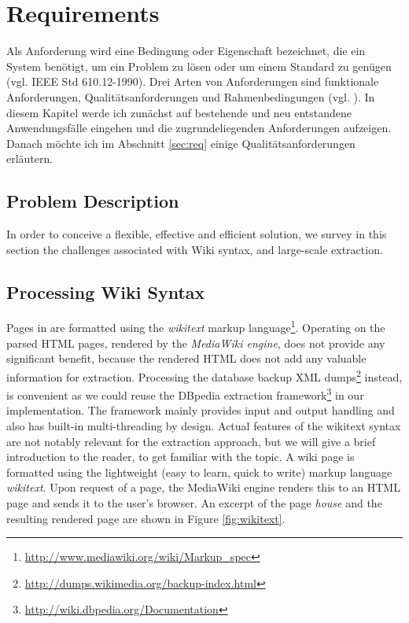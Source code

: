 \section{Requirements}
\label{sec:requirements}
Als Anforderung wird eine Bedingung oder Eigenschaft bezeichnet, die ein System benötigt, um ein Problem zu lösen oder um einem Standard zu genügen (vgl. IEEE Std 610.12-1990). Drei Arten von Anforderungen sind funktionale Anforderungen, Qualitätsanforderungen und Rahmenbedingungen (vgl. \cite{young}). In diesem Kapitel werde ich zunächst auf bestehende und neu entstandene Anwendungsfälle eingehen und die zugrundeliegenden Anforderungen aufzeigen. Danach möchte ich im Abschnitt \ref{sec:req} einige Qualitätsanforderungen erläutern.

\subsection{Problem Description}
\label{sec:problem}

In order to conceive a flexible, effective and efficient solution, we survey in this section the challenges associated with Wiki syntax, \wik and large-scale extraction.

\subsection{Processing Wiki Syntax}
Pages in \wik are formatted using the \textit{wikitext} markup language\footnote{\url{http://www.mediawiki.org/wiki/Markup_spec}}.
Operating on the parsed HTML pages, rendered by the \emph{MediaWiki engine}, does not provide any significant benefit, because the rendered HTML does not add any valuable information for extraction. 
Processing the database backup XML dumps\footnote{\url{http://dumps.wikimedia.org/backup-index.html}} instead, is convenient as we could reuse the DBpedia extraction framework\footnote{\url{http://wiki.dbpedia.org/Documentation}} in our implementation. The framework mainly provides input and output handling and also has built-in multi-threading by design.
Actual features of the wikitext syntax are not notably relevant for the extraction approach, but we will give a brief introduction to the reader, to get familiar with the topic. 
A wiki page is formatted using the lightweight (easy to learn, quick to write) markup language \textit{wikitext}. 
Upon request of a page, the MediaWiki engine renders this to an HTML page and sends it to the user's browser. 
An excerpt of the \wik page \textit{house} and the resulting rendered page are shown in Figure \ref{fig:wikitext}.

